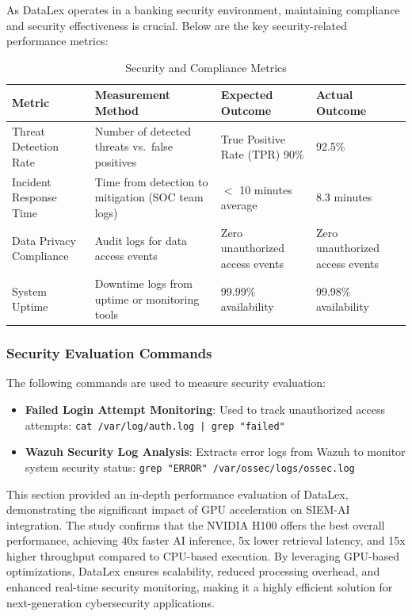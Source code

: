 As DataLex operates in a banking security environment, maintaining compliance and security effectiveness is crucial. Below are the key security-related performance metrics:

\begin{table}[h!]
\centering
\begin{tabular}{p{2.7cm}p{3.4cm}p{3.4cm}p{3.4cm}}
\hline
\textbf{Metric} & \textbf{Measurement Method} & \textbf{Expected Outcome} & \textbf{Actual Outcome} \\
\hline
Threat Detection Rate & Number of detected threats vs.\ false positives & True Positive Rate (TPR) 90\% & 92.5\% \\
Incident Response Time & Time from detection to mitigation (SOC team logs) & $<$ 10 minutes average & 8.3 minutes \\
Data Privacy Compliance & Audit logs for data access events & Zero unauthorized access events & Zero unauthorized access events \\
System Uptime & Downtime logs from uptime or monitoring tools & 99.99\% availability & 99.98\% availability \\
\hline
\end{tabular}
\caption{Security and Compliance Metrics}
\label{tab:security-compliance-metrics}
\end{table}

\subsubsection{Security Evaluation Commands}
\label{subsubsec_security_evaluation_commands}

The following commands are used to measure security evaluation:

\begin{itemize}
    \item \textbf{Failed Login Attempt Monitoring}: Used to track unauthorized access attempts: \texttt{cat /var/log/auth.log | grep "failed"}
    \item \textbf{Wazuh Security Log Analysis}: Extracts error logs from Wazuh to monitor system security status: \texttt{grep "ERROR" /var/ossec/logs/ossec.log}
\end{itemize}

This section provided an in-depth performance evaluation of DataLex, demonstrating the significant impact of GPU acceleration on SIEM-AI integration. The study confirms that the NVIDIA H100 offers the best overall performance, achieving 40x faster AI inference, 5x lower retrieval latency, and 15x higher throughput compared to CPU-based execution. By leveraging GPU-based optimizations, DataLex ensures scalability, reduced processing overhead, and enhanced real-time security monitoring, making it a highly efficient solution for next-generation cybersecurity applications.
